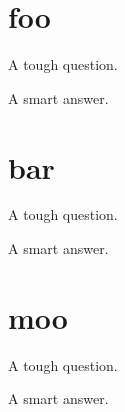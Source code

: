 \documentclass[openany]{memoir}
\begin{document}

\setlength\beforechapskip{-\baselineskip}
\chapter{foo}

\begin{Exercise}[title={foo}, label=ex1]
A tough question.
\end{Exercise}

\begin{Answer}[ref={ex1}]
A smart answer.

\end{Answer}

\chapter{bar}
\begin{Exercise}[title={foo}, label=ex2]
A tough question.
\end{Exercise}

\begin{Answer}[ref={ex2}]
A smart answer.

\end{Answer}

\appendix
\chapter{moo}
\begin{Exercise}[title={foo}, label=ex3]
A tough question.
\end{Exercise}

\begin{Answer}[ref={ex3}]
A smart answer.

\end{Answer}
\end{document}
